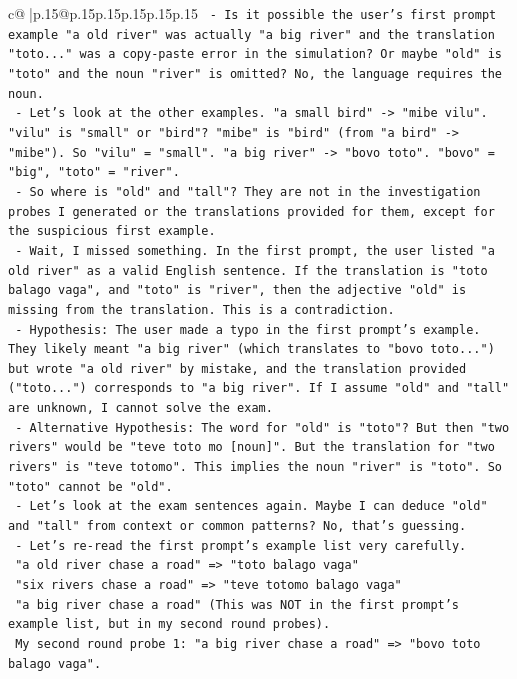 \documentclass{article}
\begin{document}
{\begin{supertabular}{c@{$\;$}|p{.15\linewidth}@{}p{.15\linewidth}p{.15\linewidth}p{.15\linewidth}p{.15\linewidth}p{.15\linewidth}}
{{{\texttt{   {-} Is it possible the user's first prompt example "a old river" was actually "a big river" and the translation "toto..." was a copy{-}paste error in the simulation? Or maybe "old" is "toto" and the noun "river" is omitted? No, the language requires the noun.} \\
\texttt{   {-} Let's look at the other examples. "a small bird" {-}> "mibe vilu". "vilu" is "small" or "bird"? "mibe" is "bird" (from "a bird" {-}> "mibe"). So "vilu" = "small". "a big river" {-}> "bovo toto". "bovo" = "big", "toto" = "river".} \\
\texttt{   {-} So where is "old" and "tall"? They are not in the investigation probes I generated or the translations provided for them, except for the suspicious first example.} \\
\texttt{   {-} Wait, I missed something. In the first prompt, the user listed "a old river" as a valid English sentence. If the translation is "toto balago vaga", and "toto" is "river", then the adjective "old" is missing from the translation. This is a contradiction.} \\
\texttt{   {-} Hypothesis: The user made a typo in the first prompt's example. They likely meant "a big river" (which translates to "bovo toto...") but wrote "a old river" by mistake, and the translation provided ("toto...") corresponds to "a big river". If I assume "old" and "tall" are unknown, I cannot solve the exam.} \\
\texttt{   {-} Alternative Hypothesis: The word for "old" is "toto"? But then "two rivers" would be "teve toto mo {[}noun{]}". But the translation for "two rivers" is "teve totomo". This implies the noun "river" is "toto". So "toto" cannot be "old".} \\
\texttt{   {-} Let's look at the exam sentences again. Maybe I can deduce "old" and "tall" from context or common patterns? No, that's guessing.} \\
\texttt{   {-} Let's re{-}read the first prompt's example list very carefully.} \\
\texttt{     "a old river chase a road" => "toto balago vaga"} \\
\texttt{     "six rivers chase a road" => "teve totomo balago vaga"} \\
\texttt{     "a big river chase a road" (This was NOT in the first prompt's example list, but in my second round probes).} \\
\texttt{     My second round probe 1: "a big river chase a road" => "bovo toto balago vaga".} \\
}}}
\end{supertabular}}
\end{document}

